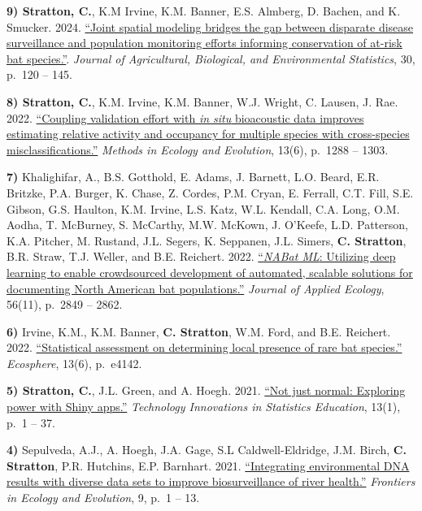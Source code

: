 \documentclass[a4paper]{article}
\begin{document}
\textbf{9) Stratton, C.}, K.M Irvine, K.M. Banner, E.S. Almberg, D.
Bachen, and K. Smucker. 2024.
\href{https://doi.org/10.1007/s13253-023-00593-8}{``Joint spatial
modeling bridges the gap between disparate disease surveillance and
population monitoring efforts informing conservation of at-risk bat
species.''}.
\textit{Journal of Agricultural, Biological, and Environmental Statistics},
30, p.~120 -- 145. \vspace*{2mm}

\textbf{8) Stratton, C.}, K.M. Irvine, K.M. Banner, W.J. Wright, C.
Lausen, J. Rae. 2022.
\href{https://doi.org/10.1111/2041-210X.13831}{``Coupling validation
effort with \emph{in situ} bioacoustic data improves estimating relative
activity and occupancy for multiple species with cross-species
misclassifications.''} \textit{Methods in Ecology and Evolution}, 13(6),
p.~1288 -- 1303. \vspace*{2mm}

\textbf{7)} Khalighifar, A., B.S. Gotthold, E. Adams, J. Barnett, L.O.
Beard, E.R. Britzke, P.A. Burger, K. Chase, Z. Cordes, P.M. Cryan, E.
Ferrall, C.T. Fill, S.E. Gibson, G.S. Haulton, K.M. Irvine, L.S. Katz,
W.L. Kendall, C.A. Long, O.M. Aodha, T. McBurney, S. McCarthy, M.W.
McKown, J. O'Keefe, L.D. Patterson, K.A. Pitcher, M. Rustand, J.L.
Segers, K. Seppanen, J.L. Simers, \textbf{C. Stratton}, B.R. Straw, T.J.
Weller, and B.E. Reichert. 2022.
\href{https://doi.org/10.1111/1365-2664.14280}{``\emph{NABat ML}:
Utilizing deep learning to enable crowdsourced development of automated,
scalable solutions for documenting North American bat populations.''}
\textit{Journal of Applied Ecology}, 56(11), p.~2849 -- 2862.
\vspace*{2mm}

\textbf{6)} Irvine, K.M., K.M. Banner, \textbf{C. Stratton}, W.M. Ford,
and B.E. Reichert. 2022.
\href{https://doi.org/10.1002/ecs2.4142}{``Statistical assessment on
determining local presence of rare bat species.''} \textit{Ecosphere},
13(6), p.~e4142. \vspace*{2mm}

\textbf{5) Stratton, C.}, J.L. Green, and A. Hoegh. 2021.
\href{https://doi.org/10.5070/T513146468}{``Not just normal: Exploring
power with Shiny apps.''}
\textit{Technology Innovations in Statistics Education}, 13(1), p.~1 --
37. \vspace*{2mm}

\textbf{4)} Sepulveda, A.J., A. Hoegh, J.A. Gage, S.L Caldwell-Eldridge,
J.M. Birch, \textbf{C. Stratton}, P.R. Hutchins, E.P. Barnhart. 2021.
\href{https://doi.org/10.3389/fevo.2021.620715}{``Integrating
environmental DNA results with diverse data sets to improve
biosurveillance of river health.''}
\textit{Frontiers in Ecology and Evolution}, 9, p.~1 -- 13.
\vspace*{2mm}
\end{document}
